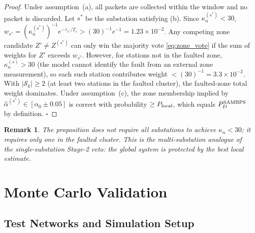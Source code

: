 \documentclass[journal]{IEEEtran}
\newtheorem{remark}{Remark}
\newcommand{\kappan}{\kappa_n}
\newcommand{\Tc}{T_c}
\begin{document}
\begin{proof}
Under assumption~(a), all packets are collected within the window and
no packet is discarded.  Let $s^\ast$ be the substation satisfying (b).
Since $\kappan^{(s^\ast)} < 30$, $w_{s^\ast} = (\kappan^{(s^\ast)})^{-1}
e^{-\tau_{s^\ast}/\Tc} > (30)^{-1} e^{-1} = 1.23\times10^{-2}$.  Any
competing zone candidate $Z' \neq Z^{(s^\ast)}$ can only win the majority
vote \eqref{eq:zone_vote} if the sum of weights for $Z'$ exceeds $w_{s^\ast}$.
However, for stations not in the faulted zone, $\kappan^{(s)} > 30$
(the model cannot identify the fault from an external zone measurement),
so each such station contributes weight $< (30)^{-1} = 3.3\times10^{-2}$.
With $|\mathcal{S}_k| \geq 2$ (at least two stations in the faulted
cluster), the faulted-zone total weight dominates.  Under assumption~(c),
the zone membership implied by $\hat{\alpha}^{(s^\ast)} \in [\alpha_0
\pm 0.05]$ is correct with probability $\geq P_{\rm local}$, which
equals $P_D^{\rm SAMBPS}$ by definition. $\square$
\end{proof}

\begin{remark}
The proposition does not require all substations to achieve
$\kappan < 30$; it requires only one in the faulted cluster.
This is the multi-substation analogue of the single-substation
Stage-2 veto: the global system is protected by the best local estimate.
\end{remark}

\section{Monte Carlo Validation}
\label{sec:validation}

\subsection{Test Networks and Simulation Setup}
\end{document}
